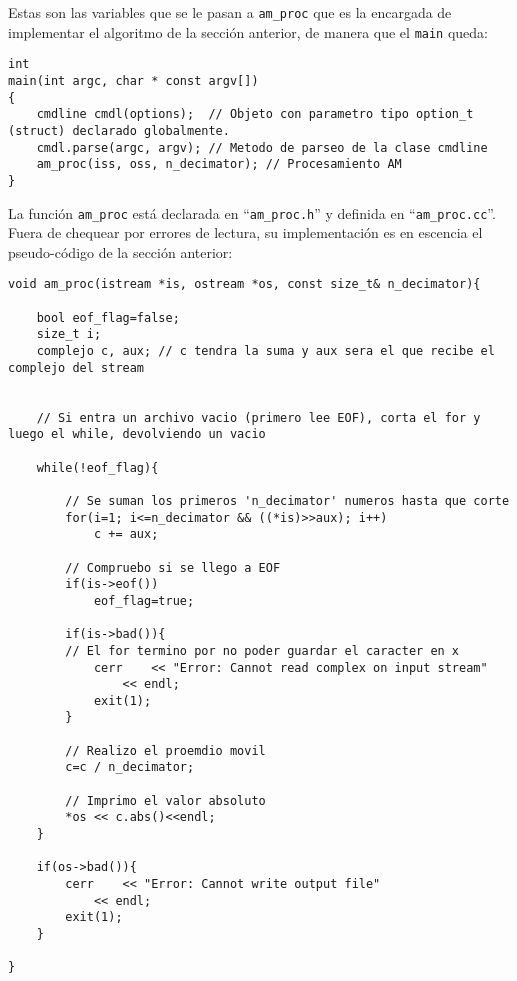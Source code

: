Estas son las variables que se le pasan a \texttt{am\_proc} que es la encargada de implementar el algoritmo de la sección anterior, de manera que el \texttt{main} queda:


\lstset{language=C++}
\begin{lstlisting}[frame=single]
int
main(int argc, char * const argv[])
{
	cmdline cmdl(options);	// Objeto con parametro tipo option_t (struct) declarado globalmente.
	cmdl.parse(argc, argv);	// Metodo de parseo de la clase cmdline
	am_proc(iss, oss, n_decimator);	// Procesamiento AM
}
\end{lstlisting}

La función \texttt{am\_proc} está declarada en ``\texttt{am\_proc.h}'' y definida en ``\texttt{am\_proc.cc}''. Fuera de chequear por errores de lectura, su implementación es en escencia el pseudo-código de la sección anterior:

\lstset{language=C++}
\begin{lstlisting}[frame=single]
void am_proc(istream *is, ostream *os, const size_t& n_decimator){
	
	bool eof_flag=false;
	size_t i;
	complejo c, aux; // c tendra la suma y aux sera el que recibe el complejo del stream	


	// Si entra un archivo vacio (primero lee EOF), corta el for y luego el while, devolviendo un vacio

	while(!eof_flag){
		
		// Se suman los primeros 'n_decimator' numeros hasta que corte 
		for(i=1; i<=n_decimator && ((*is)>>aux); i++)
			c += aux;
	
		// Compruebo si se llego a EOF
		if(is->eof())
			eof_flag=true;

		if(is->bad()){ 
		// El for termino por no poder guardar el caracter en x
			cerr	<< "Error: Cannot read complex on input stream"
				<< endl;
			exit(1);
		}		

		// Realizo el proemdio movil
		c=c / n_decimator;
			
		// Imprimo el valor absoluto
		*os << c.abs()<<endl;
	}
	
	if(os->bad()){
		cerr	<< "Error: Cannot write output file"
			<< endl;
		exit(1);
	}

}
\end{lstlisting}

